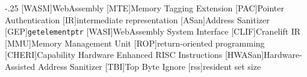 \documentclass[headsepline,footsepline,footinclude=false,oneside,fontsize=11pt,paper=a4,listof=totoc,bibliography=totoc]{scrbook}
\begin{document}
    

    \frontmatter{}

    
    
    
    
    \tableofcontents{}

    \mainmatter{}

    
    
    
    
    
    
    
    
    

    \appendix{}

    


    \begin{acronym}
        \itemsep-.25\baselineskip
        [WASM]{WebAssembly}
        [MTE]{Memory Tagging Extension}
        [PAC]{Pointer Authentication}
        [IR]{intermediate representation}
        [ASan]{Address Sanitizer}
        [GEP]{\texttt{getelementptr}}
        [WASI]{WebAssembly System Interface}
        [CLIF]{Cranelift IR}
        [MMU]{Memory Management Unit}
        [ROP]{return-oriented programming}
        [CHERI]{Capability Hardware Enhanced RISC Instructions}
        [HWASan]{Hardware-Assisted Address Sanitizer}
        [TBI]{Top Byte Ignore}
        [rss]{resident set size}
    \end{acronym}

    \listoffigures{}
    \listoftables{}
    \printbibliography{}
\end{document}
